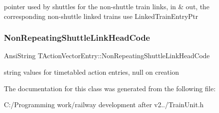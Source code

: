 pointer used by shuttles for the non-\/shuttle train links, in \& out, the corresponding non-\/shuttle linked trains use Linked\+Train\+Entry\+Ptr \mbox{\label{class_t_action_vector_entry_ae142e8e9d3a842c9b1d81bcd4e93e291}} 
\subsubsection{\texorpdfstring{Non\+Repeating\+Shuttle\+Link\+Head\+Code}{NonRepeatingShuttleLinkHeadCode}}
{\footnotesize\ttfamily Ansi\+String T\+Action\+Vector\+Entry\+::\+Non\+Repeating\+Shuttle\+Link\+Head\+Code}

string values for timetabled action entries, null on creation 

The documentation for this class was generated from the following file\+:\begin{DoxyCompactItemize}
\item 
C\+:/\+Programming work/railway development after v2../Train\+Unit.\+h\end{DoxyCompactItemize}
